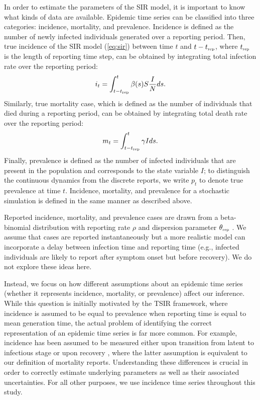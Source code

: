 \documentclass{article}
\newcommand{\eref}[1]{(\ref{eq:#1})}
\newcommand{\tsub}[2]{#1_{{\textrm{\tiny #2}}}}
\begin{document}
In order to estimate the parameters of the SIR model, it is important to know what kinds of data are available.
Epidemic time series can be classified into three categories: incidence, mortality, and prevalence.
Incidence is defined as the number of newly infected individuals generated over a reporting period.
Then, true incidence of the SIR model \eref{sir} between time $t$ and $t-\tsub{t}{rep}$, where $\tsub{t}{rep}$ is the length of reporting time step, can be obtained by integrating total infection rate over the reporting period:
\begin{equation}
i_t = \int_{t-\tsub{t}{rep}}^{t} \beta(s) S \frac{I}{N} ds.
\end{equation}
Similarly, true mortality case, which is defined as the number of individuals that died during a reporting period, can be obtained by integrating total death rate  over the reporting period:
\begin{equation}
m_t = \int_{t-\tsub{t}{rep}}^{t} \gamma I ds.
\end{equation}
Finally, prevalence is defined as the number of infected individuals that are present in the population and corresponds to the state variable $I$; to distinguish the continuous dynamics from the discrete reports, we write $p_t$ to denote true prevalence at time $t$.
Incidence, mortality, and prevalence for a stochastic simulation is defined in the same manner as described above.

Reported incidence, mortality, and prevalence cases are drawn from a beta-binomial distribution with reporting rate $\rho$ and dispersion parameter $\tsub{\theta}{rep}$ \citep{morris1997disentangling}.
We assume that cases are reported instantaneously but a more realistic model can incorporate a delay between infection time and reporting time (e.g., infected individuals are likely to report after symptom onset but before recovery).
We do not explore these ideas here.

Instead, we focus on how different assumptions about an epidemic time series (whether it represents incidence, mortality, or prevalence) affect our inference.
While this question is initially motivated by the TSIR framework, where incidence is assumed to be equal to prevalence when reporting time is equal to mean generation time, the actual problem of identifying the correct representation of an epidemic time series is far more common.
For example, incidence has been assumed to be measured either upon transition from latent to infectious stage \citep{hooker2010parameterizing, althaus2014estimating} or upon recovery \citep{he2009plug}, where the latter assumption is equivalent to our definition of mortality reports.
Understanding these differences is crucial in order to correctly estimate underlying parameters as well as their associated uncertainties.
For all other purposes, we use incidence time series throughout this study.
\end{document}
